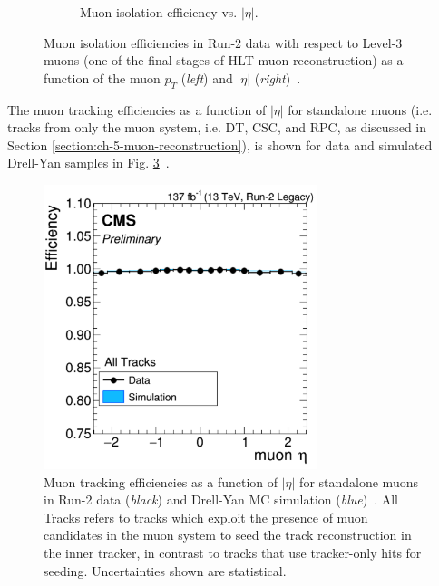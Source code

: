 \begin{figure}[ht]
\begin{subfigure}{0.45\textwidth}
        \caption{Muon isolation efficiency vs. $|\eta|$.}
        \label{fig:muon_isolation_efficiency_vsEta}
    \end{subfigure}
    \caption[Muon isolation efficiencies in Run-2 data as a function of the muon $p_{T}$ (\textit{left}) and $|\eta|$ (\textit{right}).]{Muon isolation efficiencies in Run-2 data with respect to Level-3 muons (one of the final stages of HLT muon reconstruction) as a function of the muon $p_{T}$ (\textit{left}) and $|\eta|$ (\textit{right})~\cite{CMS-MUO-16-001}.} 
\end{figure}

The muon tracking efficiencies as a function of $|\eta|$ for standalone muons (i.e. tracks from only the muon system, i.e. DT, CSC, and RPC, as discussed in Section \ref{section:ch-5-muon-reconstruction}), is shown for data and simulated Drell-Yan samples in Fig. \ref{fig:muon_tracking_efficiency}~\cite{CMS-DP-2020-035}. 

\begin{figure}[ht]
    \centering
    \includegraphics[width=8cm]{figures/ch-5-object-reconstruction-and-corrections-applied/muon_tracking_efficiency}
    \caption[Muon tracking efficiencies as a function of $|\eta|$ for standalone muons in Run-2 data (\textit{black}) and Drell-Yan (\textit{blue}) MC simulation.]{Muon tracking efficiencies as a function of $|\eta|$ for standalone muons in Run-2 data (\textit{black}) and Drell-Yan MC simulation (\textit{blue})~\cite{CMS-DP-2020-035}. All Tracks refers to tracks which exploit the presence of muon candidates in the muon system to seed the track reconstruction in the inner tracker, in contrast to tracks that use tracker-only hits for seeding. Uncertainties shown are statistical.}
    \label{fig:muon_tracking_efficiency}
\end{figure}


